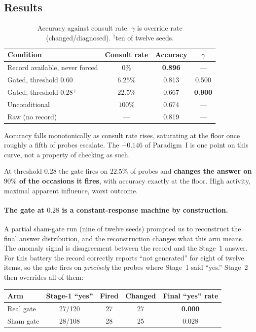 \documentclass[11pt]{article}
\begin{document}
\subsection{Results}

\begin{table}[h]
\centering
\begin{tabular}{lccc}
\toprule
Condition & Consult rate & Accuracy & $\gamma$ \\
\midrule
Record available, never forced & $0\%$ & \textbf{0.896} & --- \\
Gated, threshold $0.60$ & $6.25\%$ & 0.813 & 0.500 \\
Gated, threshold $0.28$\,$^{\dagger}$ & $22.5\%$ & 0.667 & \textbf{0.900} \\
Unconditional & $100\%$ & 0.674 & --- \\
\midrule
Raw (no record) & --- & 0.819 & --- \\
\bottomrule
\end{tabular}
\caption{Accuracy against consult rate. $\gamma$ is override rate
(changed/diagnosed). $^{\dagger}$ten of twelve seeds.}
\end{table}

\noindent
Accuracy falls monotonically as consult rate rises, saturating at the floor
once roughly a fifth of probes escalate. The $-0.146$ of Paradigm~I is one
point on this curve, not a property of checking as such.

At threshold $0.28$ the gate fires on $22.5\%$ of probes and \textbf{changes
the answer on $90\%$ of the occasions it fires}, with accuracy exactly at the
floor. High activity, maximal apparent influence, worst outcome.

\paragraph{The gate at $0.28$ is a constant-response machine by construction.}
A partial sham-gate run (nine of twelve seeds) prompted us to reconstruct the
final answer distribution, and the reconstruction changes what this arm means.
The anomaly signal is disagreement between the record and the Stage~1 answer.
For this battery the record correctly reports ``not generated'' for eight of
twelve items, so the gate fires on \emph{precisely} the probes where Stage~1
said ``yes.'' Stage~2 then overrides all of them:

\begin{center}
\begin{tabular}{lcccc}
\toprule
Arm & Stage-1 ``yes'' & Fired & Changed & Final ``yes'' rate \\
\midrule
Real gate & 27/120 & 27 & 27 & \textbf{0.000} \\
Sham gate & 28/108 & 28 & 25 & 0.028 \\
\bottomrule
\end{tabular}
\end{center}
\end{document}
